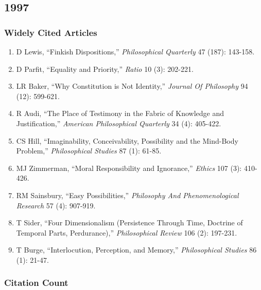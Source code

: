 \documentclass[
  10pt,
  letterpaper,
  DIV=11,
  numbers=noendperiod,
  twoside]{scrartcl}
\providecommand{\tightlist}{%
  \setlength{\itemsep}{0pt}\setlength{\parskip}{0pt}}\usepackage{longtable,booktabs,array}
\begin{document}
\newpage

\subsection{1997}\label{sec-s1997}

\subsubsection*{Widely Cited Articles}\label{widely-cited-articles-21}

\begin{enumerate}
\def\labelenumi{\arabic{enumi}.}
\tightlist
\item
  D Lewis, ``Finkish Dispositions,'' \emph{Philosophical Quarterly} 47
  (187): 143-158.
\item
  D Parfit, ``Equality and Priority,'' \emph{Ratio} 10 (3): 202-221.
\item
  LR Baker, ``Why Constitution is Not Identity,'' \emph{Journal Of
  Philosophy} 94 (12): 599-621.
\item
  R Audi, ``The Place of Testimony in the Fabric of Knowledge and
  Justification,'' \emph{American Philosophical Quarterly} 34 (4):
  405-422.
\item
  CS Hill, ``Imaginability, Conceivability, Possibility and the
  Mind-Body Problem,'' \emph{Philosophical Studies} 87 (1): 61-85.
\item
  MJ Zimmerman, ``Moral Responsibility and Ignorance,'' \emph{Ethics}
  107 (3): 410-426.
\item
  RM Sainsbury, ``Easy Possibilities,'' \emph{Philosophy And
  Phenomenological Research} 57 (4): 907-919.
\item
  T Sider, ``Four Dimensionalism (Persistence Through Time, Doctrine of
  Temporal Parts, Perdurance),'' \emph{Philosophical Review} 106 (2):
  197-231.
\item
  T Burge, ``Interlocution, Perception, and Memory,''
  \emph{Philosophical Studies} 86 (1): 21-47.
\end{enumerate}

\subsubsection*{Citation Count}\label{sec-count-1997}
\end{document}

